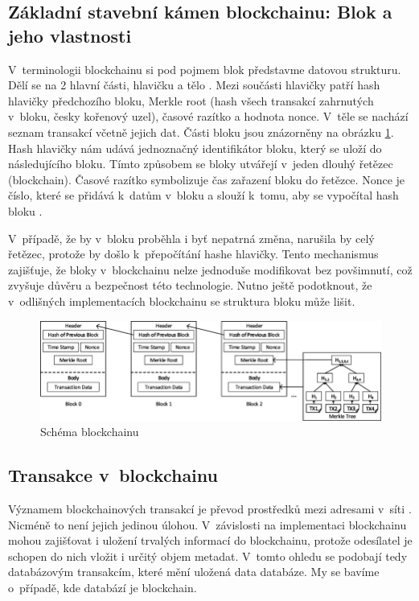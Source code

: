 \subsection*{Základní stavební kámen blockchainu: Blok a jeho vlastnosti}
V~terminologii blockchainu si pod pojmem blok představme datovou strukturu. Dělí se na 2 hlavní části, hlavičku a tělo \cite{blok}. Mezi součásti hlavičky patří hash hlavičky předchozího bloku, Merkle root (hash všech transakcí zahrnutých v~bloku, česky kořenový uzel), časové razítko a hodnota nonce. V~těle se nachází seznam transakcí včetně jejich dat. Části bloku jsou znázorněny na obrázku \ref{fig:blok}. Hash hlavičky nám udává jednoznačný identifikátor bloku, který se uloží do následujícího bloku. Tímto způsobem se bloky utvářejí v~jeden dlouhý řetězec (blockchain). Časové razítko symbolizuje čas zařazení bloku do řetězce. Nonce je číslo, které se přidává k~datům v~bloku a slouží k~tomu, aby se vypočítal hash bloku  \cite{Bitcoin_block}. 

V~případě, že by v~bloku proběhla i byť nepatrná změna, narušila by celý řetězec, protože by došlo k~přepočítání hashe hlavičky. Tento mechanismus zajišťuje, že bloky v~blockchainu nelze jednoduše modifikovat bez povšimnutí, což zvyšuje důvěru a bezpečnost této technologie. Nutno ještě podotknout, že v~odlišných implementacích blockchainu se struktura bloku může lišit.

\begin{figure}
\centering
\includegraphics[width=\textwidth]{obrazky/block.png}
\caption{Schéma blockchainu \cite{Schema}}
\label{fig:blok}
\centering
\end{figure}

\subsection*{Transakce v~blockchainu}
Významem blockchainových transakcí je převod prostředků mezi adresami v~síti \cite{Bashir2017}. Nicméně to není jejich jedinou úlohou. V~závislosti na implementaci blockchainu mohou zajišťovat i uložení trvalých informací do blockchainu, protože odesílatel je schopen do nich vložit i určitý objem metadat. V~tomto ohledu se podobají tedy databázovým transakcím, které mění uložená data databáze. My se bavíme o~případě, kde databází je blockchain. 

